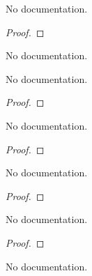 \begin{theorem}\label{psi_zero_eq_zero}
        \leanok
                No documentation.
    \end{theorem}

\begin{proof}
    \leanok
\end{proof}

\begin{theorem}\label{Varphi_eq_Sum_Inf}
                No documentation.
    \end{theorem}

\begin{theorem}\label{sub_of_sum}
        \leanok
                No documentation.
    \end{theorem}

\begin{proof}
    \leanok
\end{proof}

\begin{theorem}\label{ceil_eq_floor_add_one_iff}
        \leanok
                No documentation.
    \end{theorem}

\begin{proof}
    \leanok
\end{proof}

\begin{theorem}\label{Int.eq_of_ge_of_lt_add_one}
        \leanok
                No documentation.
    \end{theorem}

\begin{proof}
    \leanok
\end{proof}

\begin{theorem}\label{phi'_eq_ceil}
        \leanok
                No documentation.
    \end{theorem}

\begin{proof}
    \leanok
\end{proof}

\begin{theorem}\label{phi'_pos}
                No documentation.
    \end{theorem}


